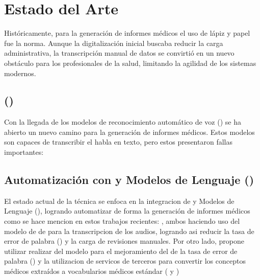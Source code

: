 \chapter{Estado del Arte}\label{chapter:estado_del_arte}

Históricamente, para la generación de informes médicos el uso de lápiz y papel fue la norma.
Aunque la digitalización inicial buscaba reducir la carga administrativa, 
la transcripción manual de datos se convirtió en un nuevo obstáculo para los profesionales de la salud,
limitando la agilidad de los sistemas modernos.

\section{ ()}
Con la llegada de los modelos de reconocimiento automático de voz () se ha abierto un nuevo 
camino para la generación de informes médicos. Estos modelos son capaces de transcribir
el habla en texto, pero estos presentaron fallas importantes:




\section{Automatización con  y Modelos de Lenguaje ()}

El estado actual de la técnica se enfoca en la integracion de  y Modelos de Lenguaje (),
logrando automatizar de forma  la generación de informes médicos como se 
hace mencion en estos trabajos recientes:
,
ambos haciendo uso del modelo de  de  para la transcripcion de los audios, 
logrando asi reducir la tasa de error de palabra () y la carga de revisiones manuales.
Por otro lado, propone utilizar realizar  del modelo 
 para el mejoramiento del de la tasa de error de palabra () y la utilizacion 
de servicos de terceros para convertir los conceptos médicos extraídos a vocabularios 
médicos estándar ( y )